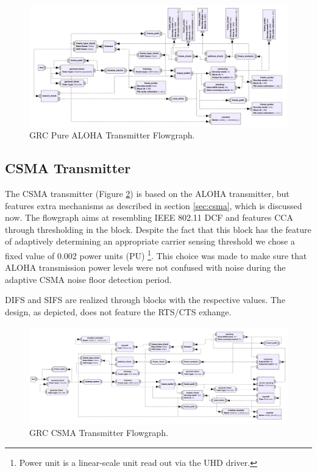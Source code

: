 \begin{figure}
	\label{fig:grc-aloha-transmitter}
	\begin{center}
		\includegraphics[width=\textwidth]{pictures/grc_aloha_transmitter_flowgraph}
\end{center}
\caption{GRC Pure ALOHA Transmitter Flowgraph.}
\end{figure}

\subsection{CSMA Transmitter}
\label{sec:csma-transmiter}

The CSMA transmitter (Figure \ref{fig:grc-csma-transmitter}) is based on the ALOHA transmitter, but features extra mechanisms as described in section \ref{sec:csma}, which is discussed now. The flowgraph aims at resembling IEEE 802.11 DCF and features CCA through thresholding in the  block. Despite the fact that this block has the feature of adaptively determining an appropriate carrier sensing threshold we chose a fixed value of 0.002 power units (PU) \footnote{Power unit is a linear-scale unit read out via the UHD driver.}. This choice was made to make sure that ALOHA transmission power levels were not confused with noise during the adaptive CSMA noise floor detection period. 

DIFS and SIFS are realized through  blocks with the respective values. The design, as depicted, does not feature the RTS/CTS exhange.

\begin{figure}
	\label{fig:grc-csma-transmitter}
	\begin{center}
		\includegraphics[width=\textwidth]{pictures/grc_csma_transmitter_flowgraph}
\end{center}
\caption{GRC CSMA Transmitter Flowgraph.}
\end{figure}

